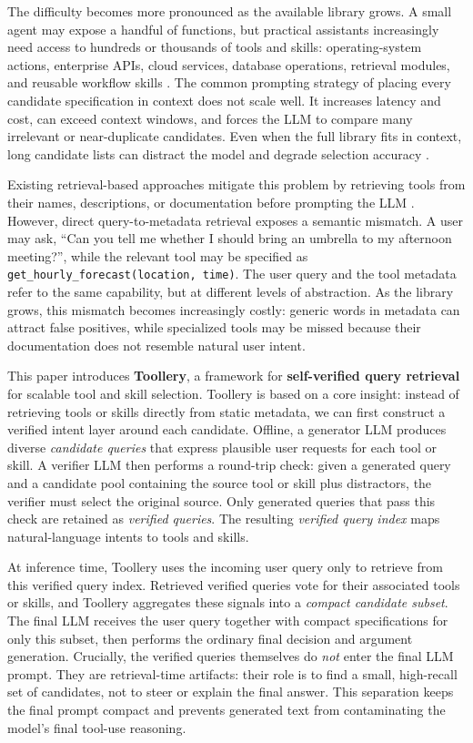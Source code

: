 The difficulty becomes more pronounced as the available library grows. A small agent may expose a handful of functions, but practical assistants increasingly need access to hundreds or thousands of tools and skills: operating-system actions, enterprise APIs, cloud services, database operations, retrieval modules, and reusable workflow skills \citep{wu2024copilot, boto3, mo2025livemcpbench, xu2025tps}. The common prompting strategy of placing every candidate specification in context does not scale well. It increases latency and cost, can exceed context windows, and forces the LLM to compare many irrelevant or near-duplicate candidates. Even when the full library fits in context, long candidate lists can distract the model and degrade selection accuracy \citep{liu2024lost, paramanayakam2025less}.

Existing retrieval-based approaches mitigate this problem by retrieving tools from their names, descriptions, or documentation before prompting the LLM \citep{agarwal2025toolrm, lin2025masstool}. However, direct query-to-metadata retrieval exposes a semantic mismatch. A user may ask, ``Can you tell me whether I should bring an umbrella to my afternoon meeting?'', while the relevant tool may be specified as \texttt{get\_hourly\_forecast(location, time)}. The user query and the tool metadata refer to the same capability, but at different levels of abstraction. As the library grows, this mismatch becomes increasingly costly: generic words in metadata can attract false positives, while specialized tools may be missed because their documentation does not resemble natural user intent.

This paper introduces \textbf{Toollery}, a framework for \textbf{self-verified query retrieval} for scalable tool and skill selection. Toollery is based on a core insight: instead of retrieving tools or skills directly from static metadata, we can first construct a verified intent layer around each candidate. Offline, a generator LLM produces diverse \emph{candidate queries} that express plausible user requests for each tool or skill. A verifier LLM then performs a round-trip check: given a generated query and a candidate pool containing the source tool or skill plus distractors, the verifier must select the original source. Only generated queries that pass this check are retained as \emph{verified queries}. The resulting \emph{verified query index} maps natural-language intents to tools and skills.

At inference time, Toollery uses the incoming user query only to retrieve from this verified query index. Retrieved verified queries vote for their associated tools or skills, and Toollery aggregates these signals into a \emph{compact candidate subset}. The final LLM receives the user query together with compact specifications for only this subset, then performs the ordinary final decision and argument generation. Crucially, the verified queries themselves do \emph{not} enter the final LLM prompt. They are retrieval-time artifacts: their role is to find a small, high-recall set of candidates, not to steer or explain the final answer. This separation keeps the final prompt compact and prevents generated text from contaminating the model's final tool-use reasoning.


